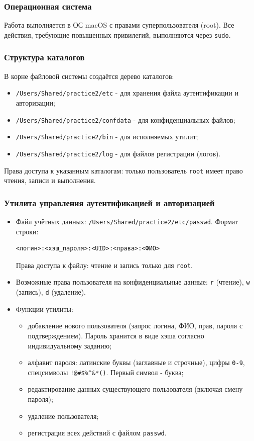 \documentclass[areasetadvanced]{scrartcl}
\begin{document}
\subsubsection{Операционная система}
Работа выполняется в ОС macOS с правами суперпользователя (root). Все действия, требующие повышенных привилегий, выполняются через \texttt{sudo}.

\subsubsection{Структура каталогов}
В корне файловой системы создаётся дерево каталогов:
\begin{itemize}
    \item \texttt{/Users/Shared/practice2/etc} - для хранения файла аутентификации и авторизации;
    \item \texttt{/Users/Shared/practice2/confdata} - для конфиденциальных файлов;
    \item \texttt{/Users/Shared/practice2/bin} - для исполняемых утилит;
    \item \texttt{/Users/Shared/practice2/log} - для файлов регистрации (логов).
\end{itemize}
Права доступа к указанным каталогам: только пользователь \texttt{root} имеет право чтения, записи и выполнения.

\subsubsection{Утилита управления аутентификацией и авторизацией}
\begin{itemize}
    \item Файл учётных данных: \texttt{/Users/Shared/practice2/etc/passwd}. Формат строки:
    \begin{verbatim}
<логин>:<хэш_пароля>:<UID>:<права>:<ФИО>
    \end{verbatim}
    Права доступа к файлу: чтение и запись только для \texttt{root}.
    \item Возможные права пользователя на конфиденциальные данные: \texttt{r} (чтение), \texttt{w} (запись), \texttt{d} (удаление).
    \item Функции утилиты:
    \begin{itemize}
        \item добавление нового пользователя (запрос логина, ФИО, прав, пароля с подтверждением). Пароль хранится в виде хэша согласно индивидуальному заданию;
        \item алфавит пароля: латинские буквы (заглавные и строчные), цифры \texttt{0-9}, спецсимволы \texttt{!@\#\$\%\^{}\&*()}. Первый символ - буква;
        \item редактирование данных существующего пользователя (включая смену пароля);
        \item удаление пользователя;
        \item регистрация всех действий с файлом \texttt{passwd}.
    \end{itemize}
\end{itemize}
\end{document}
